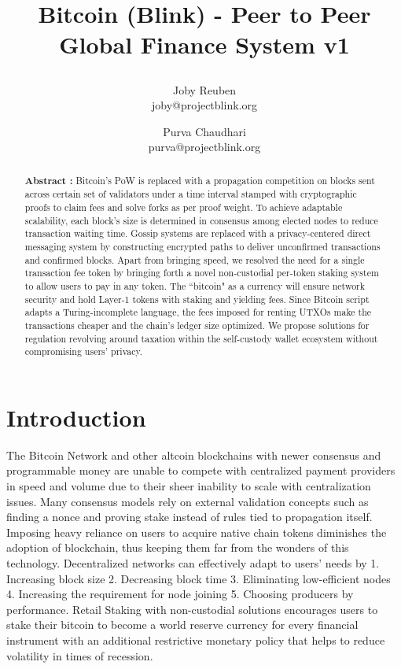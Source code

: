 \documentclass[a4paper,10pt]{article}
\title{
 \large \textbf{Bitcoin (Blink) - Peer to Peer Global Finance System v1}
\author{ \myfontt Joby Reuben \\ \myfontt joby@projectblink.org \and  \myfontt Purva Chaudhari \\ \myfontt purva@projectblink.org}}
\date{}
\begin{document}
\maketitle
\begin{abstract}
\noindent \textbf{Abstract :} Bitcoin's PoW is replaced with a propagation competition on blocks sent across certain set of validators under a time interval stamped with cryptographic proofs to claim fees and solve forks as per proof weight. To achieve adaptable scalability, each block's size is determined in consensus among elected nodes to reduce transaction waiting time. Gossip systems are replaced with a privacy-centered direct messaging system by constructing encrypted paths to deliver unconfirmed transactions and confirmed blocks. Apart from bringing speed, we resolved the need for a single transaction fee token by bringing forth a novel non-custodial per-token staking system to allow users to pay in any token. The ``bitcoin" as a currency will ensure network security and hold Layer-1 tokens with staking and yielding fees. Since Bitcoin script adapts a Turing-incomplete language, the fees imposed for renting UTXOs make the transactions cheaper and the chain's ledger size optimized. We propose solutions for regulation revolving around taxation within the self-custody wallet ecosystem without compromising users' privacy. 
\end{abstract}
\section{Introduction}
The Bitcoin Network \cite{nakamoto2008bitcoin} and other altcoin blockchains with newer consensus and programmable money are unable to compete with centralized payment providers in speed and volume due to their sheer inability to scale with centralization issues. Many consensus models rely on external validation concepts such as finding a nonce and proving stake instead of rules tied to propagation itself. Imposing heavy reliance on users to acquire native chain tokens diminishes the adoption of blockchain, thus keeping them far from the wonders of this technology. Decentralized networks can effectively adapt to users’ needs by 1. Increasing block size 2. Decreasing block time 3. Eliminating low-efficient nodes 4. Increasing the requirement for node joining 5. Choosing producers by performance. Retail Staking with non-custodial solutions encourages users to stake their bitcoin to become a world reserve currency for every financial instrument with an additional restrictive monetary policy that helps to reduce volatility in times of recession.
\end{document}
